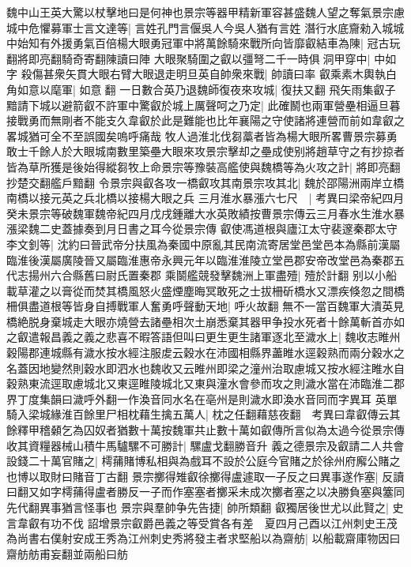 魏中山王英大驚以杖擊地曰是何神也景宗等器甲精新軍容甚盛魏人望之奪氣景宗慮城中危懼募軍士言文達等|{
	言姓孔門言偃吳人今吳人猶有言姓}
潛行水底齎勑入城城中始知有外援勇氣百倍楊大眼勇冠軍中將萬餘騎來戰所向皆靡叡結車為陳|{
	冠古玩翻將即亮翻騎奇寄翻陳讀曰陣}
大眼聚騎圍之叡以彊弩二千一時俱洞甲穿中|{
	中如字}
殺傷甚衆矢貫大眼右臂大眼退走明旦英自帥衆來戰|{
	帥讀曰率}
叡乘素木輿執白角如意以麾軍|{
	如意翻}
一日數合英乃退魏師復夜來攻城|{
	復扶又翻}
飛矢雨集叡子黯請下城以避箭叡不許軍中驚叡於城上厲聲呵之乃定|{
	此確鬭也兩軍營壘相逼旦暮接戰勇而無剛者不能支久韋叡於此是難能也比年襄陽之守使諸將連營而前如韋叡之畧城猶可全不至誤國矣嗚呼痛哉}
牧人過淮北伐芻藁者皆為楊大眼所畧曹景宗募勇敢士千餘人於大眼城南數里築壘大眼來攻景宗擊却之壘成使别將趙草守之有抄掠者皆為草所獲是後始得縱芻牧上命景宗等豫裝高艦使與魏橋等為火攻之計|{
	將即亮翻抄楚交翻艦戶黯翻}
令景宗與叡各攻一橋叡攻其南景宗攻其北|{
	魏於邵陽洲兩岸立橋南橋以接元英之兵北橋以接楊大眼之兵}
三月淮水暴漲六七尺　|{
	考異曰梁帝紀四月癸未景宗等破魏軍魏帝紀四月戊戌鍾離大水英敗績按曹景宗傳云三月春水生淮水暴漲梁魏二史蓋據奏到月日書之耳今從景宗傳}
叡使馮道根與廬江太守裴邃秦郡太守李文釗等|{
	沈約曰晉武帝分扶風為秦國中原亂其民南流寄居堂邑堂邑本為縣前漢屬臨淮後漢屬廣陵晉又屬臨淮惠帝永興元年以臨淮淮陵立堂邑郡安帝改堂邑為秦郡五代志揚州六合縣舊曰尉氏置秦郡}
乘鬬艦競發擊魏洲上軍盡殪|{
	殪於計翻}
别以小船載草灌之以膏從而焚其橋風怒火盛煙塵晦冥敢死之士拔柵斫橋水又漂疾倏忽之間橋柵俱盡道根等皆身自搏戰軍人奮勇呼聲動天地|{
	呼火故翻}
無不一當百魏軍大潰英見橋絶脱身棄城走大眼亦燒營去諸壘相次土崩悉棄其器甲争投水死者十餘萬斬首亦如之叡遣報昌義之義之悲喜不暇答語但叫曰更生更生諸軍逐北至濊水上|{
	魏收志睢州穀陽郡連城縣有濊水按水經注服䖍云穀水在沛國相縣界藎睢水逕穀熟而兩分穀水之名蓋因地變然則穀水即泗水也魏收又云睢州即梁之潼州治取慮城又按水經注睢水自穀熟東流逕取慮城北又東逕睢陵城北又東與潼水會參而攻之則濊水當在沛臨淮二郡界丁度集韻曰濊呼外翻一作渙音同水名在亳州是則濊水即渙水音同而字異耳}
英單騎入梁城緣淮百餘里尸相枕藉生擒五萬人|{
	枕之任翻藉慈夜翻　考異曰韋叡傳云其餘釋甲稽顙乞為囚奴者猶數十萬按魏軍共止數十萬如叡傳所言似為太過今從景宗傳}
收其資糧器械山積牛馬驢騾不可勝計|{
	騾盧戈翻勝音升}
義之德景宗及叡請二人共會設錢二十萬官賭之|{
	樗蒱賭博私相與為戲耳不設於公庭今官賭之於徐州府廨公賭之也博以取財曰賭音丁古翻}
景宗擲得雉叡徐擲得盧遽取一子反之曰異事遂作塞|{
	反讀曰翻又如字樗蒱得盧者勝反一子而作塞塞者擲采未成次擲者塞之以决勝負塞與簺同先代翻異事猶言怪事也}
景宗與羣帥争先告捷|{
	帥所類翻}
叡獨居後世尤以此賢之|{
	史言韋叡有功不伐}
詔增景宗叡爵邑義之等受賞各有差　夏四月己酉以江州刺史王茂為尚書右僕射安成王秀為江州刺史秀將發主者求堅船以為齋舫|{
	以船載齋庫物因曰齋舫舫甫妄翻並兩船曰舫}
